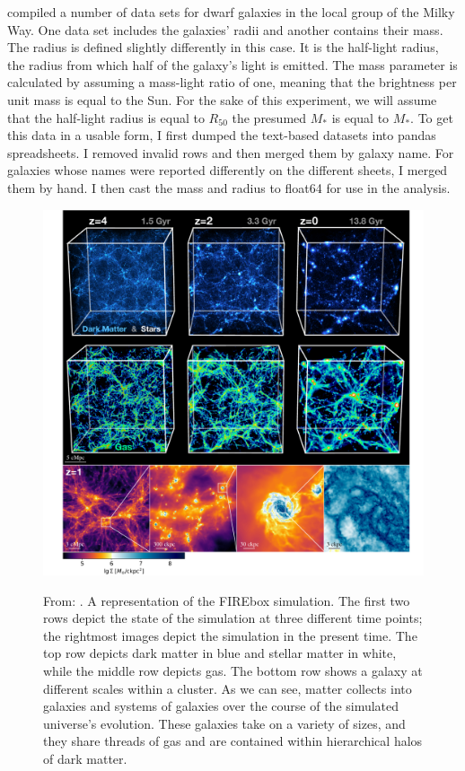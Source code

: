 \cite{mcconnachieOBSERVEDPROPERTIESDWARF2012} compiled a number of data sets for dwarf galaxies in the local group of the Milky Way. One data set includes the galaxies' radii and another contains their mass. The radius is defined slightly differently in this case. It is the half-light radius, the radius from which half of the galaxy's light is emitted. The mass parameter is calculated by assuming a mass-light ratio of one, meaning that the brightness per unit mass is equal to the Sun. For the sake of this experiment, we will assume that the half-light radius is equal to $R_{50}$ the presumed $M_*$ is equal to $M_*$. To get this data in a usable form, I first dumped the text-based datasets into pandas spreadsheets. I removed invalid rows and then merged them by galaxy name. For galaxies whose names were reported differently on the different sheets, I merged them by hand. I then cast the mass and radius to float64 for use in the analysis.



\begin{figure}
    \includegraphics*[width=\textwidth]{figs/feldmann/fig1.pdf}
    \label{fig:feldmann-visual}
    \caption{
        From: \cite{feldmannFIREboxSimulatingGalaxies2022}. A representation of the FIREbox simulation. The first two rows depict the state of the simulation at three different time points; the rightmost images depict the simulation in the present time. The top row depicts dark matter in blue and stellar matter in white, while the middle row depicts gas. The bottom row shows a galaxy at different scales within a cluster. As we can see, matter collects into galaxies and systems of galaxies over the course of the simulated universe's evolution. These galaxies take on a variety of sizes, and they share threads of gas and are contained within hierarchical halos of dark matter.
    }
\end{figure}

